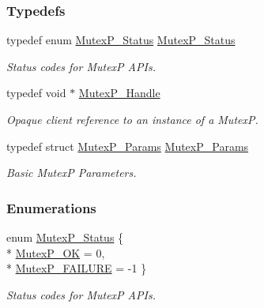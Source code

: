 \subsubsection*{Typedefs}
\begin{DoxyCompactItemize}
\item 
typedef enum \hyperlink{_mutex_p_8h_aa73c706cf0956982c1a84a0e6fe2135d}{Mutex\+P\+\_\+\+Status} \hyperlink{_mutex_p_8h_a57d61e1b19e6a6e93f9b34795356e431}{Mutex\+P\+\_\+\+Status}
\begin{DoxyCompactList}\small\item\em Status codes for Mutex\+P A\+P\+Is. \end{DoxyCompactList}\item 
typedef void $\ast$ \hyperlink{_mutex_p_8h_a1bf40a0e31521bb036d1180d4338b5d9}{Mutex\+P\+\_\+\+Handle}
\begin{DoxyCompactList}\small\item\em Opaque client reference to an instance of a Mutex\+P. \end{DoxyCompactList}\item 
typedef struct \hyperlink{struct_mutex_p___params}{Mutex\+P\+\_\+\+Params} \hyperlink{_mutex_p_8h_a96daeded90eff8d2d53b15190530a2a6}{Mutex\+P\+\_\+\+Params}
\begin{DoxyCompactList}\small\item\em Basic Mutex\+P Parameters. \end{DoxyCompactList}\end{DoxyCompactItemize}
\subsubsection*{Enumerations}
\begin{DoxyCompactItemize}
\item 
enum \hyperlink{_mutex_p_8h_aa73c706cf0956982c1a84a0e6fe2135d}{Mutex\+P\+\_\+\+Status} \{ \\*
\hyperlink{_mutex_p_8h_aa73c706cf0956982c1a84a0e6fe2135da64a440a76488541a75038263621380bc}{Mutex\+P\+\_\+\+O\+K} = 0, 
\\*
\hyperlink{_mutex_p_8h_aa73c706cf0956982c1a84a0e6fe2135da4a5635016f1caa1382d00bc0a07f9183}{Mutex\+P\+\_\+\+F\+A\+I\+L\+U\+R\+E} = -\/1
 \}
\begin{DoxyCompactList}\small\item\em Status codes for Mutex\+P A\+P\+Is. \end{DoxyCompactList}\end{DoxyCompactItemize}
